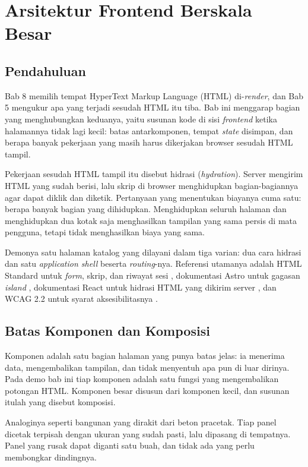 \chapter{Arsitektur Frontend Berskala Besar}
\label{ch:frontend}

\section{Pendahuluan}

Bab 8 memilih tempat HyperText Markup Language (HTML) di-\textit{render}, dan Bab 5
mengukur apa yang terjadi sesudah HTML itu tiba. Bab ini menggarap bagian yang menghubungkan keduanya,
yaitu susunan kode di sisi \textit{frontend} ketika halamannya tidak lagi
kecil: batas antarkomponen, tempat \textit{state} disimpan, dan berapa banyak
pekerjaan yang masih harus dikerjakan browser sesudah HTML tampil.

Pekerjaan sesudah HTML tampil itu disebut hidrasi (\textit{hydration}).
Server mengirim HTML yang sudah berisi, lalu skrip di browser menghidupkan
bagian-bagiannya agar dapat diklik dan diketik. Pertanyaan yang menentukan
biayanya cuma satu: berapa banyak bagian yang dihidupkan. Menghidupkan
seluruh halaman dan menghidupkan dua kotak saja menghasilkan tampilan yang
sama persis di mata pengguna, tetapi tidak menghasilkan biaya yang sama.

Demonya satu halaman katalog yang dilayani dalam tiga varian: dua cara
hidrasi dan satu \textit{application shell} beserta \textit{routing}-nya.
Referensi utamanya adalah HTML Standard untuk \textit{form}, skrip, dan
riwayat sesi \cite{whatwg-html}, dokumentasi Astro untuk gagasan \textit{island}
\cite{astro-islands}, dokumentasi React untuk hidrasi HTML yang dikirim server
\cite{react-hydrateroot}, dan WCAG 2.2 untuk syarat aksesibilitasnya
\cite{w3c-wcag22}.

\section{Batas Komponen dan Komposisi}

Komponen adalah satu bagian halaman yang punya batas jelas: ia menerima data,
mengembalikan tampilan, dan tidak menyentuh apa pun di luar dirinya. Pada
demo bab ini tiap komponen adalah satu fungsi yang mengembalikan potongan
HTML. Komponen besar disusun dari komponen kecil, dan susunan itulah yang
disebut komposisi.

Analoginya seperti bangunan yang dirakit dari beton pracetak. Tiap panel
dicetak terpisah dengan ukuran yang sudah pasti, lalu dipasang di tempatnya.
Panel yang rusak dapat diganti satu buah, dan tidak ada yang perlu
membongkar dindingnya.

